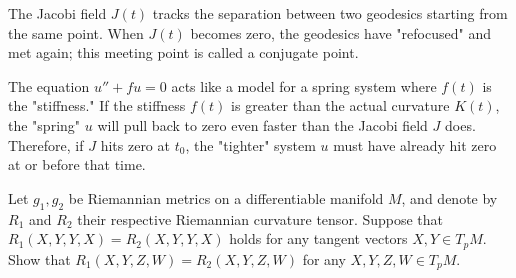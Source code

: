 \begin{solution}
The Jacobi field $J(t)$ tracks the separation between two geodesics starting from the same point. When $J(t)$ becomes zero, the geodesics have "refocused" and met again; this meeting point is called a conjugate point. 

The equation $u'' + fu = 0$ acts like a model for a spring system where $f(t)$ is the "stiffness." If the stiffness $f(t)$ is greater than the actual curvature $K(t)$, the "spring" $u$ will pull back to zero even faster than the Jacobi field $J$ does. Therefore, if $J$ hits zero at $t_0$, the "tighter" system $u$ must have already hit zero at or before that time.
\end{solution}

\begin{exercise}
\label{geometry:2013:4}
Let $g_{1}, g_{2}$ be Riemannian metrics on a differentiable manifold $M$, and denote by $R_{1}$ and $R_{2}$ their respective Riemannian curvature tensor. Suppose that $R_{1}(X, Y, Y, X) = R_{2}(X, Y, Y, X)$ holds for any tangent vectors $X, Y \in T_{p}M$. Show that $R_{1}(X, Y, Z, W) = R_{2}(X, Y, Z, W)$ for any $X, Y, Z, W \in T_{p}M$.
\end{exercise}

